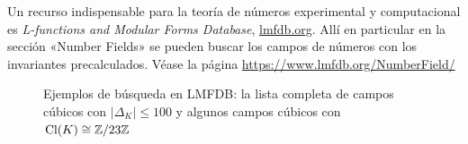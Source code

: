 Un recurso indispensable para la teoría de números experimental y computacional
es \emph{{L-functions} and Modular Forms Database},
\href{https://www.lmfdb.org/}{lmfdb.org}. Allí en particular en la sección
«Number Fields» se pueden buscar los campos de números con los invariantes
precalculados. Véase la página \url{https://www.lmfdb.org/NumberField/}

\begin{figure}
  \begin{center}
    \setlength{\fboxsep}{1pt}
    \setlength{\fboxrule}{0.5pt}
  \end{center}
  
  \begin{center}
    \setlength{\fboxsep}{1pt}
    \setlength{\fboxrule}{0.5pt}
  \end{center}

  \caption{Ejemplos de búsqueda en LMFDB:
    la lista completa de campos cúbicos con $|\Delta_K| \le 100$ y
    algunos campos cúbicos con $\operatorname{Cl} (K) \cong \mathbb{Z}/23\mathbb{Z}$}
\end{figure}

